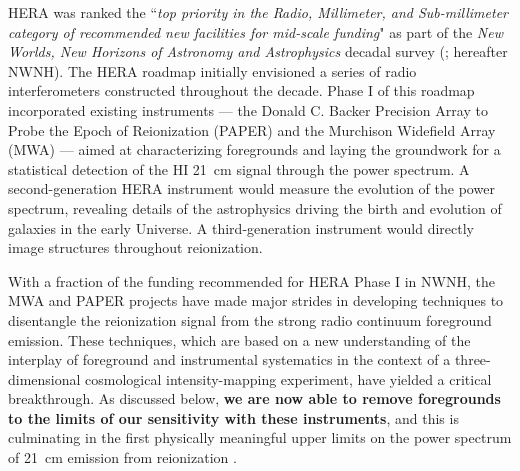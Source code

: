 \documentclass[preprint]{aastex}
\begin{document}
HERA was ranked the ``{\it top priority in the Radio, Millimeter, and
Sub-millimeter category of recommended new facilities for mid-scale
funding}" as part of the {\it New Worlds, New Horizons of Astronomy
and Astrophysics} decadal survey (\citealt{astro2010}; hereafter
NWNH).  The HERA roadmap initially envisioned a series of radio
interferometers constructed throughout the decade. Phase I of this roadmap
incorporated existing instruments --- the Donald C. Backer Precision Array to Probe the Epoch of
Reionization (PAPER) and the Murchison Widefield Array (MWA) ---
aimed at characterizing foregrounds and laying the
groundwork for a statistical detection of the HI 21~cm signal through
the power spectrum.  A second-generation HERA instrument would measure
the evolution of the power spectrum, revealing details of the astrophysics driving
the birth and evolution of galaxies 
in the early Universe. A third-generation instrument would
directly image structures throughout reionization.

With a fraction of the funding recommended for HERA Phase I
in NWNH, the MWA and PAPER projects have made
major strides in developing techniques to disentangle
the reionization signal from the strong radio continuum foreground
emission.  These techniques, which are based on a new
understanding of the interplay of foreground and instrumental systematics
in the context of a three-dimensional cosmological intensity-mapping experiment,
have yielded a critical breakthrough.  As discussed below, {\bf we are now able to remove 
foregrounds to the limits of our sensitivity with these instruments},
and this is culminating in the first physically meaningful upper limits
on the power spectrum of 21~cm emission from reionization \citep{parsons_et_al2013}.


\end{document}
